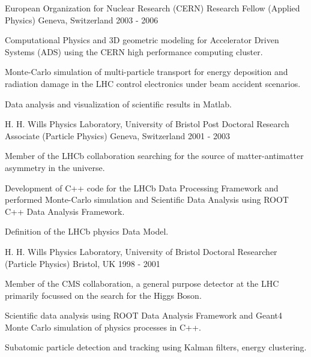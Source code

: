 \begin{cventries}
\cventry
{European Organization for Nuclear Research (CERN)} %
{Research Fellow (Applied Physics)} %
{Geneva, Switzerland} %
{2003 - 2006} %
{
  \begin{cvitems} %
    \item {
        Computational Physics and 3D geometric modeling for Accelerator Driven Systems (ADS) using the CERN 
        high performance computing cluster.}
    \item {
        Monte-Carlo simulation of multi-particle transport for energy deposition 
        and radiation damage in the LHC control electronics under 
        beam accident scenarios.} 
        \item{
        Data analysis and visualization of scientific results in Matlab.}
  \end{cvitems}
}

\cventry
{H. H. Wills Physics Laboratory, University of Bristol} %
{Post Doctoral Research Associate (Particle Physics)} %
{Geneva, Switzerland} %
{2001 - 2003} %
{
  \begin{cvitems} %
    \item {
        Member of the LHCb collaboration searching for the source of matter-antimatter 
        asymmetry in the universe.}
    \item {
          Development of C++ code for the LHCb Data Processing Framework and 
          performed Monte-Carlo simulation
          and Scientific Data Analysis using ROOT C++ Data Analysis Framework.}
    \item {
        Definition of the LHCb physics Data Model.}
  \end{cvitems}
}

\cventry
{H. H. Wills Physics Laboratory, University of Bristol} %
{Doctoral Researcher (Particle Physics)} %
{Bristol, UK} %
{1998 - 2001} %
{
  \begin{cvitems} %
    \item {
        Member of the CMS collaboration, a general purpose detector at the LHC primarily
        focussed on the search for the Higgs Boson.}
    \item {
        Scientific data analysis using ROOT Data Analysis Framework and Geant4 Monte Carlo simulation of physics processes in C++.}
    \item {
      Subatomic particle detection and tracking using Kalman filters, energy clustering.
    }
  \end{cvitems}
}

\end{cventries}